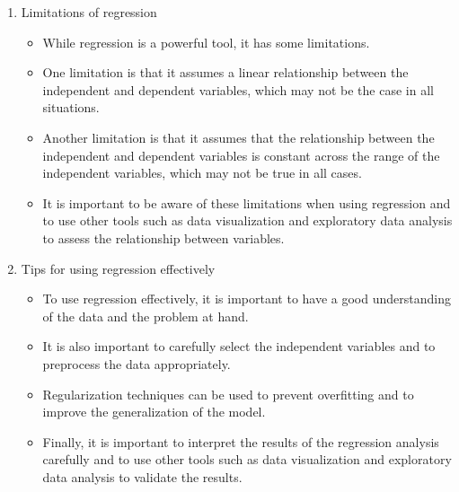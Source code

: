 \documentclass{article}
\begin{document}
\begin{enumerate}[label=\alph*)]
\item Limitations of regression
\begin{itemize}
\item While regression is a powerful tool, it has some limitations.
\item One limitation is that it assumes a linear relationship between the independent and dependent variables, which may not be the case in all situations.
\item Another limitation is that it assumes that the relationship between the independent and dependent variables is constant across the range of the independent variables, which may not be true in all cases.
\item It is important to be aware of these limitations when using regression and to use other tools such as data visualization and exploratory data analysis to assess the relationship between variables.
\end{itemize}

\item Tips for using regression effectively
\begin{itemize}
\item To use regression effectively, it is important to have a good understanding of the data and the problem at hand.
\item It is also important to carefully select the independent variables and to preprocess the data appropriately.
\item Regularization techniques can be used to prevent overfitting and to improve the generalization of the model.
\item Finally, it is important to interpret the results of the regression analysis carefully and to use other tools such as data visualization and exploratory data analysis to validate the results.
\end{itemize}
\end{enumerate}
\end{document}
